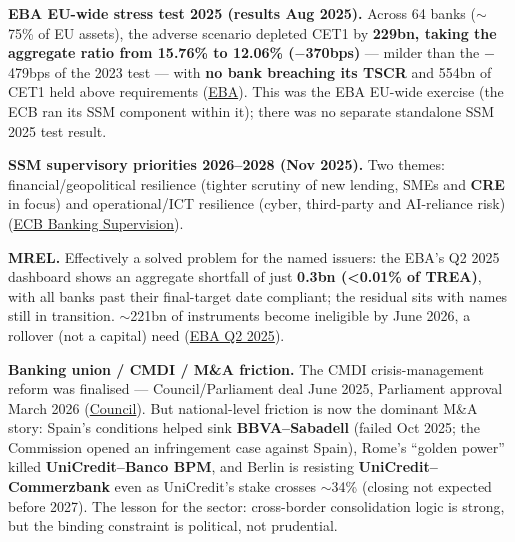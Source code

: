 \documentclass[10pt,a4paper]{article}
\begin{document}
\textbf{EBA EU-wide stress test 2025 (results Aug 2025).} Across 64 banks ($\sim$75\% of EU assets), the adverse scenario depleted CET1 by \textbf{\texteuro229bn, taking the aggregate ratio from 15.76\% to 12.06\% ($-$370bps)} --- milder than the $-$479bps of the 2023 test --- with \textbf{no bank breaching its TSCR} and \texteuro554bn of CET1 held above requirements (\href{https://www.eba.europa.eu/publications-and-media/publications/2025-eu-wide-stress-test-results}{EBA}). This was the EBA EU-wide exercise (the ECB ran its SSM component within it); there was no separate standalone SSM 2025 test result.

\textbf{SSM supervisory priorities 2026--2028 (Nov 2025).} Two themes: financial/geopolitical resilience (tighter scrutiny of new lending, SMEs and \textbf{CRE} in focus) and operational/ICT resilience (cyber, third-party and AI-reliance risk) (\href{https://www.bankingsupervision.europa.eu/framework/priorities/html/ssm.supervisory_priorities202511.en.html}{ECB Banking Supervision}).

\textbf{MREL.} Effectively a solved problem for the named issuers: the EBA's Q2 2025 dashboard shows an aggregate shortfall of just \textbf{\texteuro0.3bn (<0.01\% of TREA)}, with all banks past their final-target date compliant; the residual sits with names still in transition. $\sim$\texteuro221bn of instruments become ineligible by June 2026, a rollover (not a capital) need (\href{https://www.eba.europa.eu/publications-and-media/press-releases/eba-publishes-its-q2-2025-dashboard-minimum-requirement-own-funds-and-eligible-liabilities}{EBA Q2 2025}).

\textbf{Banking union / CMDI / M\&A friction.} The CMDI crisis-management reform was finalised --- Council/Parliament deal June 2025, Parliament approval March 2026 (\href{https://www.consilium.europa.eu/en/press/press-releases/2025/06/25/bank-resolution-council-and-parliament-strike-deal-to-strengthen-the-eu-crisis-management-framework/}{Council}). But national-level friction is now the dominant M\&A story: Spain's conditions helped sink \textbf{BBVA--Sabadell} (failed Oct 2025; the Commission opened an infringement case against Spain), Rome's ``golden power'' killed \textbf{UniCredit--Banco BPM}, and Berlin is resisting \textbf{UniCredit--Commerzbank} even as UniCredit's stake crosses $\sim$34\% (closing not expected before 2027). The lesson for the sector: cross-border consolidation logic is strong, but the binding constraint is political, not prudential.

\end{document}
